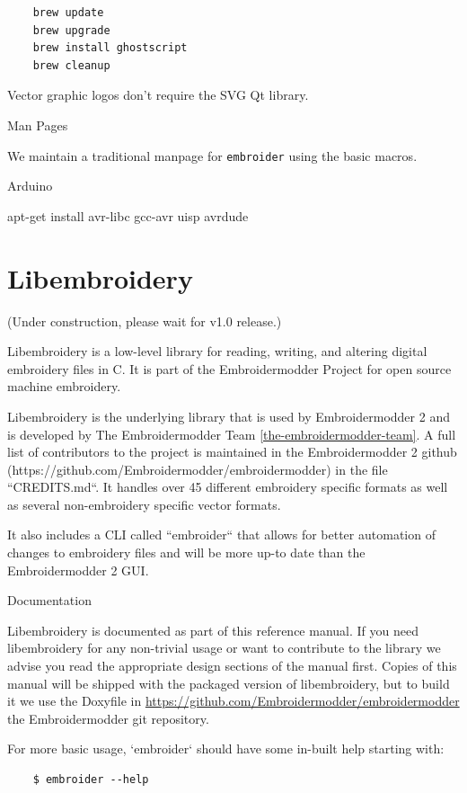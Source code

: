\documentclass[a4paper]{report}
\begin{document}
\begin{lstlisting}
    brew update
    brew upgrade
    brew install ghostscript
    brew cleanup
\end{lstlisting}

Vector graphic logos don't require the SVG Qt library.

Man Pages
~~~~~~~~~

We maintain a traditional manpage for \texttt{embroider} using
the basic macros.

Arduino
~~~~~~~

    apt-get install avr-libc gcc-avr uisp avrdude

\chapter{Libembroidery}

(Under construction, please wait for v1.0 release.)

Libembroidery is a low-level library for reading, writing,
and altering digital embroidery files in C. It is part of the Embroidermodder Project
for open source machine embroidery.

Libembroidery is the underlying library that is used by Embroidermodder 2
and is developed by  The Embroidermodder Team \ref{the-embroidermodder-team}.
A full list of contributors to the project is maintained in
the Embroidermodder 2 github (https://github.com/Embroidermodder/embroidermodder)
in the file ``CREDITS.md``. It handles over 45 different embroidery specific formats as well
as several non-embroidery specific vector formats.

It also includes a CLI called ``embroider`` that allows for better automation of
changes to embroidery files and will be more up-to date than
the Embroidermodder 2 GUI.

Documentation
~~~~~~~~~~~~~

Libembroidery is documented as part of this reference manual. If you need
libembroidery for any non-trivial usage or want to contribute to the library we
advise you read the appropriate design sections of the manual first. Copies of
this manual will be shipped with the packaged version of libembroidery, but to
build it we use the Doxyfile in
\url{https://github.com/Embroidermodder/embroidermodder} the Embroidermodder git
repository.

For more basic usage, `embroider` should have some in-built help
starting with:

\begin{lstlisting}
    $ embroider --help
\end{lstlisting}
\end{document}
